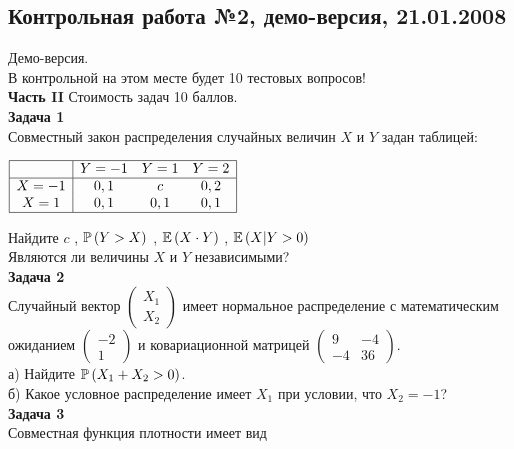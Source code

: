 \documentclass[12pt, a4paper]{article}\usepackage[]{graphicx}\usepackage[]{color}
\begin{document}
	\subsection{Контрольная работа №2, демо-версия, 21.01.2008}

	Демо-версия. \\

	В контрольной на этом месте будет 10 тестовых вопросов! \\


	\textbf{Часть II} Стоимость задач 10 баллов. \\

	\textbf{Задача 1} \\ %
	Совместный закон распределения случайных величин  $X$  и  $Y$
	задан таблицей:

	$\begin{array}{|c|ccc|}
	\hline
	{} & {Y=-1} & {Y=1} & {Y=2}\\
	\hline
	{X=-1} & {0,1} & {c} & {0,2}\\
	{X=1} & {0,1} & {0,1} & {0,1} \\
	\hline
	\end{array}$

	Найдите  $c$ ,  $\P\left(Y>X\right)$ ,  $\E\left(X\cdot Y
	\right)$ ,  $\E\left(X|Y>0\right)$ \\
	Являются ли величины $X$ и $Y$ независимыми? \\

	\textbf{Задача 2} \\ %
	Случайный вектор  $\left(\begin{array}{c}
	{X_{1} } \\ {X_{2} }
	\end{array}\right)$  имеет нормальное распределение с
	математическим ожиданием  $\left(\begin{array}{c} {-2} \\ {1}
	\end{array}\right)$  и ковариационной матрицей
	$\left(\begin{array}{cc} {9} & {-4} \\ {-4} & {36}
	\end{array}\right)$. \\
	а) Найдите  $\P\left(X_{1} +X_{2} >0\right)$. \\
	б) Какое условное распределение имеет $X_{1}$ при условии, что $X_{2}=-1$? \\

	\textbf{Задача 3} \\ %
	Совместная функция плотности имеет вид
\end{document}
